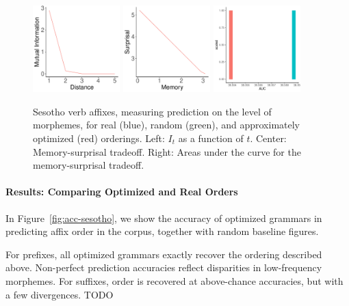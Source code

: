 \begin{figure}
	\begin{center}
\includegraphics[width=0.3\textwidth]{figures/Sesotho-suffixes-byMorphemes-it-heldout.pdf}
\includegraphics[width=0.3\textwidth]{figures/Sesotho-suffixes-byMorphemes-memsurp-heldout.pdf}
\includegraphics[width=0.3\textwidth]{figures/Sesotho-suffixes-byMorphemes-auc-hist-heldout.pdf}
\end{center}
	\caption{Sesotho verb affixes, measuring prediction on the level of morphemes, for real (blue), random (green), and approximately optimized (red) orderings. Left: $I_t$ as a function of $t$. Center: Memory-surprisal tradeoff. Right: Areas under the curve for the memory-surprisal tradeoff.}\label{fig:jap-morph}
\end{figure}


\paragraph{Results: Comparing Optimized and Real Orders}

In Figure~\ref{fig:acc-sesotho}, we show the accuracy of optimized grammars in predicting affix order in the corpus, together with random baseline figures.


For prefixes, all optimized grammars exactly recover the ordering described above.
Non-perfect prediction accuracies reflect disparities in low-frequency morphemes.
For suffixes, order is recovered at above-chance accuracies, but with a few divergences.
TODO


